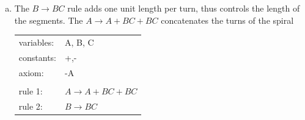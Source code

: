 \documentclass[10pt,a4paper,boxed]{hmcpset}
\begin{document}
\begin{problem}[Assignment 29]
\end{problem}
\begin{solution}
	\begin{enumerate}[a)]
		\item 
			The $B \rightarrow B C$ rule adds one unit length per turn, thus controls the length of the segments. The $A \rightarrow A +B C +B C$ concatenates the turns of the spiral
				\begin{tabular}{ll}
					 variables: & A, B, C\\ 
					 constants: & +,- \\
					 axiom: & -A \\
							& \\
					 rule 1: & $A \rightarrow A +B C +B C$ \\
					 rule 2: & $B \rightarrow B C$ \\
				\end{tabular}


\end{enumerate}
\end{solution}
\end{document}
